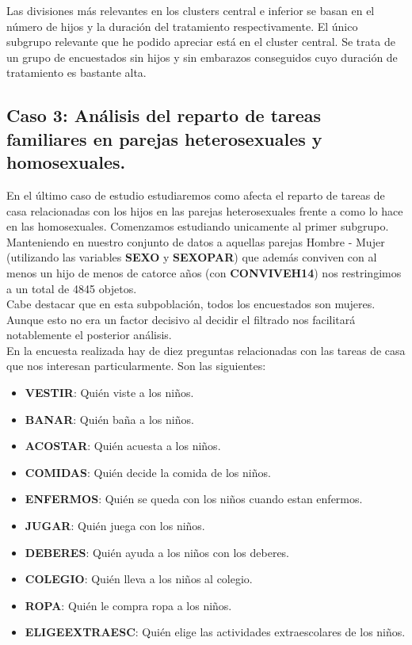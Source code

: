 \documentclass[11pt,a4paper]{article}
\begin{document}
	Las divisiones más relevantes en los clusters central e inferior se basan en el número de hijos y la duración del tratamiento respectivamente. El único subgrupo relevante que he podido apreciar está en el cluster central. Se trata de un grupo de encuestados sin hijos y sin embarazos conseguidos cuyo duración de tratamiento es bastante alta. \\
	
	\subsection{Caso 3: Análisis del reparto de tareas familiares en parejas heterosexuales y homosexuales. }
	
	En el último caso de estudio estudiaremos como afecta el reparto de tareas de casa relacionadas con los hijos en las parejas heterosexuales frente a como lo hace en las homosexuales. Comenzamos estudiando unicamente al primer subgrupo. Manteniendo en nuestro conjunto de datos a aquellas parejas Hombre - Mujer (utilizando las variables \textbf{SEXO} y \textbf{SEXOPAR}) que además conviven con al menos un hijo de menos de catorce años (con \textbf{CONVIVEH14}) nos restringimos a un total de 4845 objetos. \\
	
	Cabe destacar que en esta subpoblación, todos los encuestados son mujeres. Aunque esto no era un factor decisivo al decidir el filtrado nos facilitará notablemente el posterior análisis. \\
	
	En la encuesta realizada hay de diez preguntas relacionadas con las tareas de casa que nos interesan particularmente. Son las siguientes:

	\begin{itemize}
		\item \textbf{VESTIR}: Quién viste a los niños.
		\item \textbf{BANAR}: Quién baña a los niños.
		\item \textbf{ACOSTAR}: Quién acuesta a los niños.
		\item \textbf{COMIDAS}: Quién decide la comida de los niños.
		\item \textbf{ENFERMOS}: Quién se queda con los niños cuando estan enfermos.
		\item \textbf{JUGAR}: Quién juega con los niños.
		\item \textbf{DEBERES}: Quién ayuda a los niños con los deberes.
		\item \textbf{COLEGIO}: Quién lleva a los niños al colegio.
		\item \textbf{ROPA}: Quién le compra ropa a los niños.
		\item \textbf{ELIGEEXTRAESC}: Quién elige las actividades extraescolares de los niños.
	\end{itemize}
\end{document}
